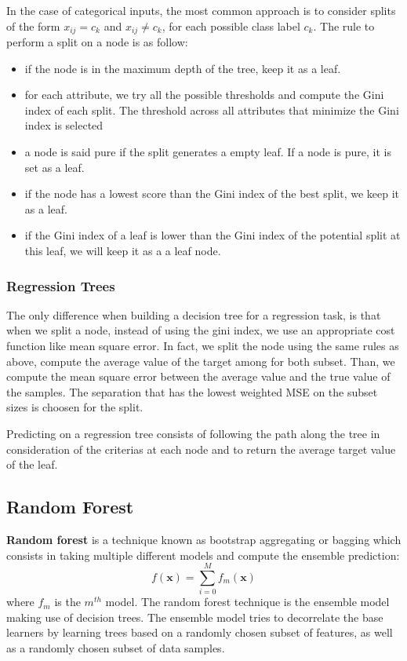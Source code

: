 \documentclass[12pt]{report}
\begin{document}
                In the case of categorical inputs, the most common approach is to consider splits of the form $x_{ij} = c_k$ and $x_{ij} \neq c_k$, for each possible class label $c_k$.
                The rule to perform a split on a node is as follow:
                \begin{itemize}
                    \item if the node is in the maximum depth of the tree, keep it as a leaf.
                    \item for each attribute, we try all the possible thresholds and compute the Gini index of each split. The threshold across all attributes that minimize the Gini index is selected
                    \item a node is said pure if the split generates a empty leaf. If a node is pure, it is set as a leaf.
                    \item if the node has a lowest score than the Gini index of the best split, we keep it as a leaf.
                    \item if the Gini index of a leaf is lower than the Gini index of the potential split at this leaf, we will keep it as a a leaf node.
                \end{itemize}
                
            \subsubsection{Regression Trees}
                The only difference when building a decision tree for a regression task, is that when we split a node, instead of using the gini index, we use an appropriate cost function like mean square error. In fact, we split the node using the same rules as above, compute the average value of the target among for both subset. Than, we compute the mean square error between the average value and the true value of the samples. The separation that has the lowest weighted MSE on the subset sizes is choosen for the split.
                
                Predicting on a regression tree consists of following the path along the tree in consideration of the criterias at each node and to return the average target value of the leaf.
            
        \subsection{Random Forest}
            \textbf{Random forest} is a technique known as bootstrap aggregating or bagging which consists in taking multiple different models and compute the ensemble prediction:
            \begin{equation}
                f(\boldsymbol{x}) = \sum_{i = 0}^{M}f_m(\boldsymbol{x})
            \end{equation}
            where $f_m$ is the $m^{th}$ model.
            The random forest technique is the ensemble model making use of decision trees. The ensemble model tries to decorrelate the base
            learners by learning trees based on a randomly chosen subset of features, as well as a randomly chosen subset of data samples.
\end{document}
